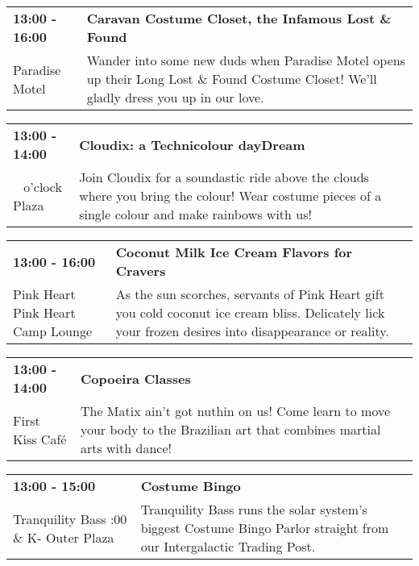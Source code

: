 \begin{tabular}{ p{1in} p{2.2in} }
    \textbf{13:00 - 16:00} & \textbf{Caravan Costume Closet, the Infamous Lost \& Found } \\
    Paradise Motel \newline  & Wander into some new duds when Paradise Motel opens up their Long Lost \& Found Costume Closet! We'll gladly dress you up in our love. \\
    \hline 
\end{tabular}
    
\begin{tabular}{ p{1in} p{2.2in} }
    \textbf{13:00 - 14:00} & \textbf{Cloudix: a Technicolour dayDream} \\
    ~ \newline 9 o'clock Plaza & Join Cloudix for a soundastic ride above the clouds where you bring the colour! Wear costume pieces of a single colour and make rainbows with us! \\
    \hline 
\end{tabular}
    
\begin{tabular}{ p{1in} p{2.2in} }
    \textbf{13:00 - 16:00} & \textbf{Coconut Milk Ice Cream Flavors for Cravers} \\
    Pink Heart \newline Pink Heart Camp Lounge & As the sun scorches, servants of Pink Heart gift you cold coconut ice cream bliss. Delicately lick your frozen desires into disappearance or reality. \\
    \hline 
\end{tabular}
    
\begin{tabular}{ p{1in} p{2.2in} }
    \textbf{13:00 - 14:00} & \textbf{Copoeira Classes} \\
    First Kiss Caf\'e \newline  & The Matix ain't got nuthin on us!  Come learn to move your body to the Brazilian art that combines martial arts with dance! \\
    \hline 
\end{tabular}
    
\begin{tabular}{ p{1in} p{2.2in} }
    \textbf{13:00 - 15:00} & \textbf{Costume Bingo} \\
    Tranquility Bass \newline 9:00 \& K- Outer Plaza & Tranquility Bass runs the solar system's biggest Costume Bingo Parlor straight from our Intergalactic Trading Post. \\
    \hline 
\end{tabular}
    
